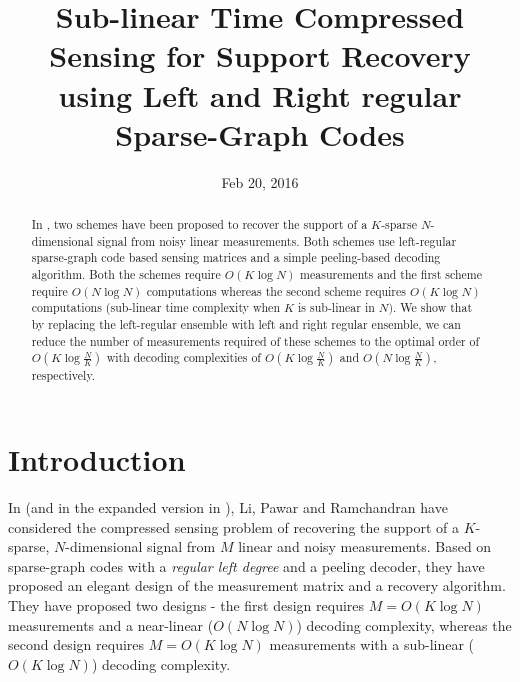 \documentclass[conference]{IEEEtran}
\begin{document}
\IEEEoverridecommandlockouts


\title{\LARGE{Sub-linear Time Compressed Sensing for Support Recovery using Left and Right regular Sparse-Graph Codes}}
\author{

}
\date{Feb 20, 2016}

\maketitle
\begin{abstract}
In \cite{li2015subisit,li2015subdraft}, two schemes have been proposed to recover the support of a $K$-sparse $N$-dimensional signal from noisy linear measurements. Both schemes use left-regular sparse-graph code based sensing matrices and a simple peeling-based decoding algorithm. Both the schemes require $O(K \log N)$ measurements and the first scheme require $O(N \log N)$ computations whereas the second scheme requires $O(K \log N)$ computations (sub-linear time complexity when $K$ is sub-linear in $N)$. We show that by replacing the left-regular ensemble with left and right regular ensemble, we can reduce the number of measurements required of these schemes to the optimal order of $O\left(K \log \frac{N}{K} \right)$ with decoding complexities of $O(K \log \frac{N}{K})$ and $O(N \log \frac{N}{K})$, respectively.
\end{abstract}
\pagestyle{empty}

\section{Introduction}
In \cite{li2015subisit} (and in the expanded version in \cite{li2015subdraft}), Li, Pawar and Ramchandran have considered the compressed sensing problem of recovering the support of a $K$-sparse, $N$-dimensional signal from $M$ linear and noisy measurements. Based on sparse-graph codes with a \emph{regular left degree} and a peeling decoder, they have proposed an elegant design of the measurement matrix and a recovery algorithm. %
They have proposed two designs - the first design requires $M = O(K \log N)$ measurements and a near-linear ($O(N \log N)$) decoding complexity, whereas the second design requires $M = O(K \log N)$ measurements with a sub-linear ($O(K \log N)$) decoding complexity.
\end{document}
